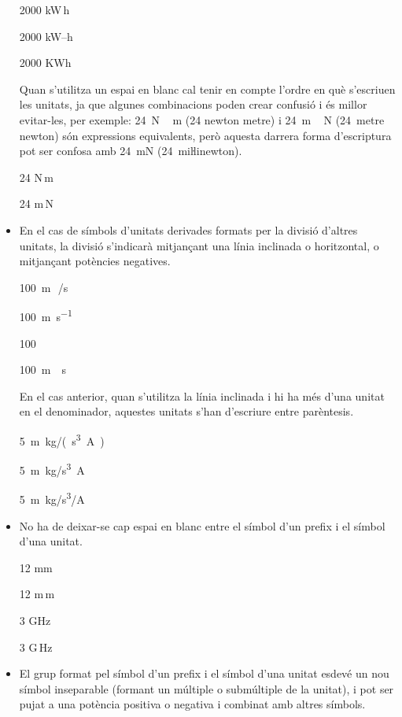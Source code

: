 \begin{itemize}
\textcolor{Green}\faCheckSquare{} 2000 kW\,h

\textcolor{Red}\faTimesCircle{} 2000 kW--h

\textcolor{Red}\faTimesCircle{} 2000 KWh

Quan s'utilitza un espai en blanc cal tenir en compte  l'ordre en què s'escriuen
les unitats, ja que algunes combinacions poden crear confusió i
és millor evitar-les, per exemple: \SI{24}{N\,m} (24 newton metre) i
\SI{24}{m\,N} (24~metre newton) són expressions equivalents, però
aquesta darrera forma d'escriptura pot ser confosa amb \SI{24}{mN} (24~miŀlinewton).

\textcolor{Green}\faCheckSquare{} 24 N\,m

\textcolor{Blue}\faQuestionCircle{} 24 m\,N

\item En el cas de símbols d'unitats derivades formats per la divisió
d'altres unitats, la divisió s'indicarà mitjançant una línia
inclinada o horitzontal, o mitjançant potències negatives.

\textcolor{Green}\faCheckSquare{} \SI{100}{m\,/s}

\textcolor{Green}\faCheckSquare{} \SI{100}{m.s^{-1}}

\textcolor{Green}\faCheckSquare{} \SI{100}{}

\textcolor{Red}\faTimesCircle{} \SI{100}{m\div s}

En el cas anterior, quan s'utilitza la línia inclinada i hi ha més
d'una unitat en el denominador, aquestes unitats s'han d'escriure
entre parèntesis.

\textcolor{Green}\faCheckSquare{} \SI{5}{m.kg/(s^3.A)}

\textcolor{Red}\faTimesCircle{} \SI{5}{m.kg/s^3.A}

\textcolor{Red}\faTimesCircle{} \SI{5}{m.kg/s^3/A}


\item No ha de deixar-se cap espai en blanc entre el símbol d'un prefix i
el símbol d'una unitat.

\textcolor{Green}\faCheckSquare{} 12 mm

\textcolor{Red}\faTimesCircle{} 12 m\,m

\textcolor{Green}\faCheckSquare{}  3 GHz

\textcolor{Red}\faTimesCircle{}  3 G\,Hz


\item El grup format pel símbol d'un prefix i el símbol d'una unitat
esdevé un nou símbol inseparable (formant un múltiple o submúltiple
de la unitat), i pot ser pujat a una potència positiva o negativa i
combinat amb altres símbols.


\end{itemize}
